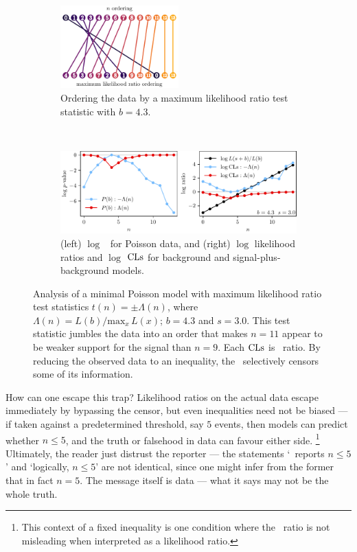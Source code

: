 \begin{figure}[tp]
\centering
\begin{subfigure}{\textwidth}
\centering
\includegraphics[width=0.5\textwidth]{figures/searches_cls_plots_with_pvals_order.pdf}
\caption{%
Ordering the data by a maximum likelihood ratio test statistic with $b=4.3$.
}
\end{subfigure}
\\[.5em]
\begin{subfigure}{\textwidth}
\centering
\includegraphics[width=\textwidth]{figures/searches_cls_plots_with_pvals_t.pdf}
\caption{%
(left) $\log$ \pvalues\ for Poisson data,
and (right) $\log$ likelihood ratios and $\log$ $\mathrm{CLs}$ for
background and signal-plus-background models.%
}
\end{subfigure}
\caption[
Analysis of a minimal Poisson model with maximum likelihood ratio
test statistics
]{%
Analysis of a minimal Poisson model with maximum likelihood ratio
test statistics $t(n) = \pm \Lambda(n)$,
where $\Lambda(n) = L(b)/\mathrm{max}_x\,L(x)$; $b = 4.3$ and $s = 3.0$.
This test statistic jumbles the data into an order that makes $n=11$ appear to
be weaker support for the signal than $n=9$.
Each $\mathrm{CLs}$ is \pvalue\ ratio.
By reducing the observed data to an inequality, the \pvalue\ selectively
censors some of its information.
}
\label{fig:searches_sb_t}
\end{figure}

How can one escape this trap?
Likelihood ratios on the actual data escape immediately by bypassing the
censor, but even inequalities need not be biased --- if taken against a
predetermined threshold, say $5$ events, then models can predict whether
$n \leq 5$, and the truth or falsehood in data can favour either side.%
\footnote{%
This context of a fixed inequality is one condition where the
\pvalue\ ratio is not misleading when interpreted as a likelihood ratio.%
}
Ultimately, the reader just distrust the reporter ---
the statements `\atlas\ reports $n \leq 5$' and `logically, $n \leq 5$' are not
identical, since one might infer from the former that in fact $n = 5$.
The message itself is data --- what it says may not be the whole truth.

